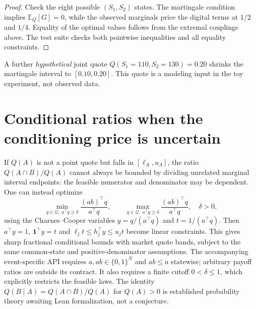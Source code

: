 \documentclass[11pt]{article}
\newcommand{\one}{\mathbf{1}}
\newcommand{\EE}{\mathbb{E}}
\newcommand{\QQ}{\mathcal{Q}}
\begin{document}
\begin{proof}
Check the eight possible $(S_1,S_2)$ states. The martingale
condition implies $\EE_Q[G]=0$, while the observed marginals price
the digital terms at $1/2$ and $1/4$. Equality of the optimal values
follows from the extremal couplings above. The test suite checks both
pointwise inequalities and all equality constraints.
\end{proof}
A further \emph{hypothetical} joint quote
$Q(S_1=110,S_2=130)=0.20$ shrinks the martingale interval to $[0.10,0.20]$.
This quote is a modeling input in the toy experiment, not observed data.

\section{Conditional ratios when the conditioning price is uncertain}
If $Q(A)$ is not a point quote but falls in $[\ell_A,u_A]$, the ratio
$Q(A\cap B)/Q(A)$ cannot always be bounded by dividing unrelated marginal
interval endpoints: the feasible numerator and denominator may be dependent.
One can instead optimize
\begin{equation}
\min_{q\in\QQ,\;a^\top q\ge\delta}
\frac{(ab)^\top q}{a^\top q},\qquad
\max_{q\in\QQ,\;a^\top q\ge\delta}
\frac{(ab)^\top q}{a^\top q},\quad \delta>0,
\end{equation}
using the Charnes--Cooper variables $y=q/(a^\top q)$ and
$t=1/(a^\top q)$. Then $a^\top y=1$, $\one^\top y=t$ and
$\ell_jt\le h_j^\top y\le u_jt$ become linear constraints.
This gives sharp fractional conditional bounds with market quote bands,
subject to the same common-state and positive-denominator assumptions.
The accompanying event-specific API requires $a,ab\in\{0,1\}^N$ and
$ab\le a$ statewise; arbitrary payoff ratios are outside its contract.
It also requires a finite cutoff $0<\delta\le1$, which explicitly restricts
the feasible laws. The identity $Q(B\mid A)=Q(A\cap B)/Q(A)$ for $Q(A)>0$
is established probability theory awaiting Lean formalization, not a conjecture.
\end{document}
